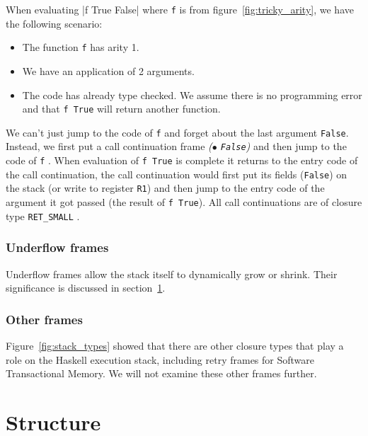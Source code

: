 When evaluating |f True False|
where \texttt{f} is from figure~\ref{fig:tricky_arity}, we have the
following scenario:

\begin{itemize}
  \item
    The function \texttt{f} has arity 1.
  \item
    We have an application of 2 arguments.
  \item
    The code has already type checked. We assume there is no
programming error and that \texttt{f True} will return another function.
\end{itemize}

We can't just jump to the code of \texttt{f} and forget about the last
argument \texttt{False}. Instead, we first put a call continuation
frame \emph{($\bullet$ \texttt{False})} and then jump to the code of \texttt{f}
\cite{evalapplyjfp06}.
When evaluation of \texttt{f True} is complete it returns to
the entry code of the call continuation, the call continuation would
first put its fields (\texttt{False}) on the stack (or write to
register \texttt{R1}) and then jump to the entry code of the argument it
got passed (the result of \texttt{f True}).
All call continuations are of closure type \texttt{RET\_SMALL}
\cite{github_genapply_RET_SMALL}.

\subsubsection{Underflow frames}

Underflow frames allow the stack itself to dynamically grow or
shrink. Their significance is discussed in section~\ref{sec:structure_of_stack}.

\subsubsection{Other frames}

Figure~\ref{fig:stack_types} showed that there are other closure types
that play a role on the Haskell execution stack, including retry frames
for Software Transactional Memory. We will not examine these other
frames further.

\section{Structure} \label{sec:structure_of_stack}

